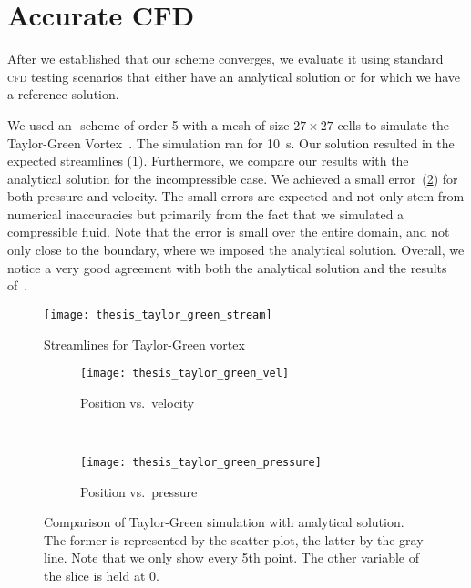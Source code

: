 \section{Accurate CFD}\label{sec:cfd}
After we established that our scheme converges, we evaluate it using standard \textsc{cfd} testing scenarios that either have an analytical solution or for which we have a reference solution.

We used an \aderdg{}-scheme of order 5 with a mesh of size $27 \times 27$ cells to simulate the Taylor-Green Vortex~.
The simulation ran for \SI{10}{\s}.
Our solution resulted in the expected streamlines (\cref{fig:taylor-green-streamlines}).
Furthermore, we compare our results with the analytical solution for the incompressible case.
We achieved a small error~(\cref{fig:taylor-green-result}) for both pressure and velocity.
The small errors are expected and not only stem from numerical inaccuracies but primarily from the fact that we simulated a compressible fluid.
Note that the error is small over the entire domain, and not only close to the boundary, where we imposed the analytical solution.
Overall, we notice a very good agreement with both the analytical solution and the results of~\cite{dumbser2016high}.

\begin{figure}[htb]
  \centering
  \texttt{[image: thesis\_taylor\_green\_stream]}
  \caption{\label{fig:taylor-green-streamlines}%
    Streamlines for Taylor-Green vortex}
\end{figure}

\begin{figure}[htb]
  \centering
  \begin{subfigure}[t]{0.5\textwidth}
    \centering
    \texttt{[image: thesis\_taylor\_green\_vel]}
    \caption{Position vs.\ velocity}
  \end{subfigure}~%
  \begin{subfigure}[t]{0.5\textwidth}
    \centering
    \texttt{[image: thesis\_taylor\_green\_pressure]}
    \caption{Position vs.\ pressure}
  \end{subfigure}
  \caption{\label{fig:taylor-green-result}%
    Comparison of Taylor-Green simulation with analytical solution.
    The former is represented by the scatter plot, the latter by the gray line.
    Note that we only show every 5th point.
    The other variable of the slice is held at 0.}
\end{figure}

